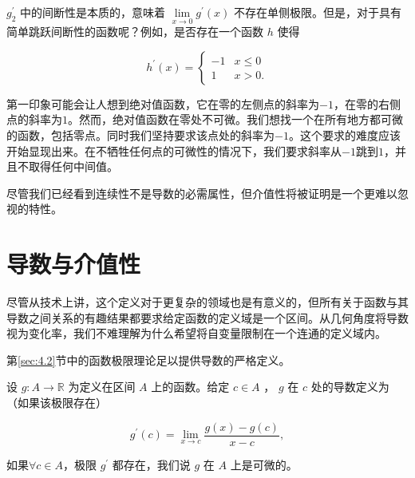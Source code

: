 \({g}_{2}^{\prime }\) 中的间断性是本质的，意味着 \(\mathop{\lim }\limits_{{x \rightarrow  0}}{g}^{\prime }\left( x\right)\) 不存在单侧极限。但是，对于具有简单跳跃间断性的函数呢？例如，是否存在一个函数 \(h\) 使得

\[
{h}^{\prime }\left( x\right)  = \left\{  \begin{array}{ll}  - 1 & x \leq  0 \\  1 & x > 0. \end{array}\right.
\]

第一印象可能会让人想到绝对值函数，它在零的左侧点的斜率为$-1$，在零的右侧点的斜率为$1$。然而，绝对值函数在零处不可微。我们想找一个在所有地方都可微的函数，包括零点。同时我们坚持要求该点处的斜率为$-1$。这个要求的难度应该开始显现出来。在不牺牲任何点的可微性的情况下，我们要求斜率从$-1$跳到$1$，并且不取得任何中间值。

尽管我们已经看到连续性不是导数的必需属性，但介值性将被证明是一个更难以忽视的特性。

\section{导数与介值性}
\label{sec:5.2}
尽管从技术上讲，这个定义对于更复杂的领域也是有意义的，但所有关于函数与其导数之间关系的有趣结果都要求给定函数的定义域是一个区间。从几何角度将导数视为变化率，我们不难理解为什么希望将自变量限制在一个连通的定义域内。

第\ref{sec:4.2}节中的函数极限理论足以提供导数的严格定义。

\begin{Def}
  \label{def:5.2.1}
  设 \(g : A \rightarrow  \mathbb{R}\) 为定义在区间 \(A\) 上的函数。给定 \(c \in  A\) ， \(g\) 在 \(c\) 处的导数定义为（如果该极限存在）

\[
{g}^{\prime }\left( c\right)  = \mathop{\lim }\limits_{{x \rightarrow  c}}\frac{g\left( x\right)  - g\left( c\right) }{x - c},
\]

如果$\forall c\in A$，极限 \({g}^{\prime }\) 都存在，我们说 \(g\) 在 \(A\) 上是可微的。
\end{Def}

